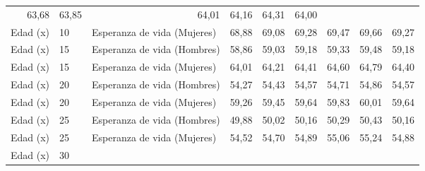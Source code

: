 \begin{tabular}{lllllllll}
  \multicolumn{1}{|r}{63,68} &
  \multicolumn{1}{r}{63,85} &
  \multicolumn{1}{r}{64,01} &
  \multicolumn{1}{r}{64,16} &
  \multicolumn{1}{r}{64,31} &
  \multicolumn{1}{r}{64,00} \\
\multicolumn{1}{l}{Edad (x)} &
  \multicolumn{1}{l}{10} &
  \multicolumn{1}{l}{Esperanza de vida (Mujeres)} &
  \multicolumn{1}{|r}{68,88} &
  \multicolumn{1}{r}{69,08} &
  \multicolumn{1}{r}{69,28} &
  \multicolumn{1}{r}{69,47} &
  \multicolumn{1}{r}{69,66} &
  \multicolumn{1}{r}{69,27} \\
\multicolumn{1}{l}{Edad (x)} &
  \multicolumn{1}{l}{15} &
  \multicolumn{1}{l}{Esperanza de vida (Hombres)} &
  \multicolumn{1}{|r}{58,86} &
  \multicolumn{1}{r}{59,03} &
  \multicolumn{1}{r}{59,18} &
  \multicolumn{1}{r}{59,33} &
  \multicolumn{1}{r}{59,48} &
  \multicolumn{1}{r}{59,18} \\
\multicolumn{1}{l}{Edad (x)} &
  \multicolumn{1}{l}{15} &
  \multicolumn{1}{l}{Esperanza de vida (Mujeres)} &
  \multicolumn{1}{|r}{64,01} &
  \multicolumn{1}{r}{64,21} &
  \multicolumn{1}{r}{64,41} &
  \multicolumn{1}{r}{64,60} &
  \multicolumn{1}{r}{64,79} &
  \multicolumn{1}{r}{64,40} \\
\multicolumn{1}{l}{Edad (x)} &
  \multicolumn{1}{l}{20} &
  \multicolumn{1}{l}{Esperanza de vida (Hombres)} &
  \multicolumn{1}{|r}{54,27} &
  \multicolumn{1}{r}{54,43} &
  \multicolumn{1}{r}{54,57} &
  \multicolumn{1}{r}{54,71} &
  \multicolumn{1}{r}{54,86} &
  \multicolumn{1}{r}{54,57} \\
\multicolumn{1}{l}{Edad (x)} &
  \multicolumn{1}{l}{20} &
  \multicolumn{1}{l}{Esperanza de vida (Mujeres)} &
  \multicolumn{1}{|r}{59,26} &
  \multicolumn{1}{r}{59,45} &
  \multicolumn{1}{r}{59,64} &
  \multicolumn{1}{r}{59,83} &
  \multicolumn{1}{r}{60,01} &
  \multicolumn{1}{r}{59,64} \\
\multicolumn{1}{l}{Edad (x)} &
  \multicolumn{1}{l}{25} &
  \multicolumn{1}{l}{Esperanza de vida (Hombres)} &
  \multicolumn{1}{|r}{49,88} &
  \multicolumn{1}{r}{50,02} &
  \multicolumn{1}{r}{50,16} &
  \multicolumn{1}{r}{50,29} &
  \multicolumn{1}{r}{50,43} &
  \multicolumn{1}{r}{50,16} \\
\multicolumn{1}{l}{Edad (x)} &
  \multicolumn{1}{l}{25} &
  \multicolumn{1}{l}{Esperanza de vida (Mujeres)} &
  \multicolumn{1}{|r}{54,52} &
  \multicolumn{1}{r}{54,70} &
  \multicolumn{1}{r}{54,89} &
  \multicolumn{1}{r}{55,06} &
  \multicolumn{1}{r}{55,24} &
  \multicolumn{1}{r}{54,88} \\
\multicolumn{1}{l}{Edad (x)} &
  \multicolumn{1}{l}{30} &

\end{tabular}
